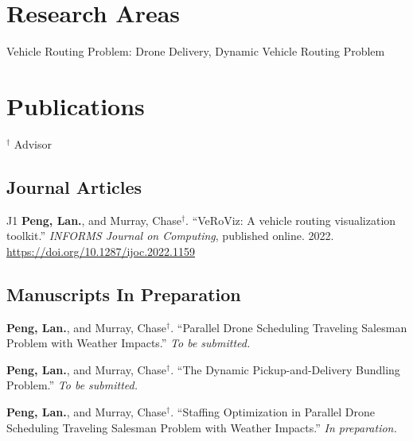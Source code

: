 \documentclass[12pt,letterpaper]{report}
\newcommand{\listitemspace}{0.25em}
\renewenvironment{itemize}
{\begin{list}{}{\setlength{\leftmargin}{0em}
                \setlength{\parskip}{0em}
                \setlength{\itemsep}{\listitemspace}
                \setlength{\parsep}{\listitemspace}}}
{\end{list}}
\begin{document}
    \section*{Research Areas}
    \begin{itemize}
        \item Vehicle Routing Problem: Drone Delivery, Dynamic Vehicle Routing Problem
    \end{itemize}

    \section*{Publications}
    $^\dagger$ Advisor
    \subsection*{Journal Articles}
    \begin{tablist}
        \item[J1] \tab{}\textbf{Peng, Lan.}, and Murray, Chase$^\dagger$. \enquote{VeRoViz: A vehicle routing visualization toolkit.} \textit{INFORMS Journal on Computing}, published online. 2022. \href{https://pubsonline.informs.org/doi/abs/10.1287/ijoc.2022.1159}{https://doi.org/10.1287/ijoc.2022.1159}
    \end{tablist}

    \subsection*{Manuscripts In Preparation}
    \begin{tablist}
    \item[] \tab{}\textbf{Peng, Lan.}, and Murray, Chase$^\dagger$. \enquote{Parallel Drone Scheduling Traveling Salesman Problem with Weather Impacts.} \textit{To be submitted.}
    \item[] \tab{}\textbf{Peng, Lan.}, and Murray, Chase$^\dagger$. \enquote{The Dynamic Pickup-and-Delivery Bundling Problem.} \textit{To be submitted.}
    \item[] \tab{}\textbf{Peng, Lan.}, and Murray, Chase$^\dagger$. \enquote{Staffing Optimization in Parallel Drone Scheduling Traveling Salesman Problem with Weather Impacts.} \textit{In preparation.}
    \end{tablist}
\end{document}
